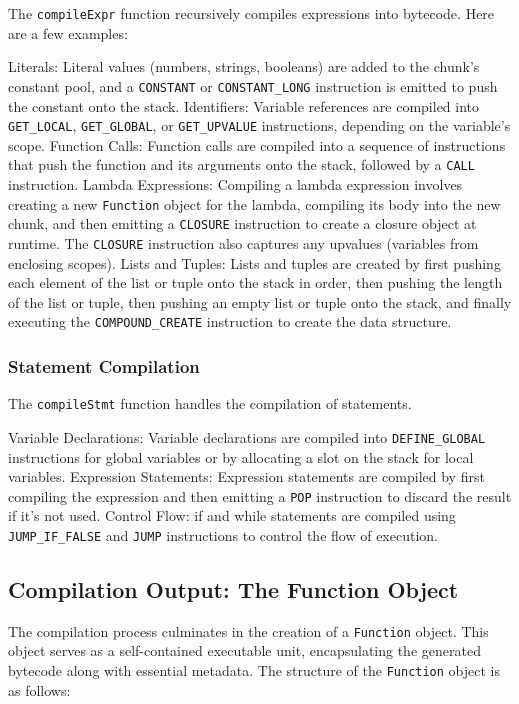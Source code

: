 The \texttt{compileExpr} function recursively compiles expressions into bytecode.
Here are a few examples:

Literals: Literal values (numbers, strings, booleans) are added to the chunk's constant pool, and a \texttt{CONSTANT} or \texttt{CONSTANT\_LONG} instruction is emitted to push the constant onto the stack.
Identifiers: Variable references are compiled into \texttt{GET\_LOCAL}, \texttt{GET\_GLOBAL}, or 
\texttt{GET\_UPVALUE} instructions, depending on the variable's scope.
Function Calls: Function calls are compiled into a sequence of instructions that push the function and its arguments onto the stack, followed by a \texttt{CALL} instruction.
Lambda Expressions: Compiling a lambda expression involves creating a new \texttt{Function} object for the lambda, compiling its body into the new chunk, and then emitting a \texttt{CLOSURE} instruction to create a closure object at runtime.
The \texttt{CLOSURE} instruction also captures any upvalues (variables from enclosing scopes).
Lists and Tuples: Lists and tuples are created by first pushing each element of the list or tuple onto the stack in 
order, then pushing the length of the list or tuple, then pushing an empty list or tuple onto the stack, and finally executing the \texttt{COMPOUND\_CREATE} instruction to create the data structure.

\subsubsection{Statement Compilation}

The \texttt{compileStmt} function handles the compilation of statements.

Variable Declarations: Variable declarations are compiled into \texttt{DEFINE\_GLOBAL} instructions for global 
variables or by allocating a slot on the stack for local variables.
Expression Statements: Expression statements are compiled by first compiling the expression and then emitting a \texttt{POP} instruction to discard the result if it's not used.
Control Flow: if and while statements are compiled using \texttt{JUMP\_IF\_FALSE} and \texttt{JUMP} instructions 
to control the flow of execution.

\subsection{Compilation Output: The Function Object}
\label{subsec:compilation-output}

The compilation process culminates in the creation of a \texttt{Function} object.
This object serves as a self-contained executable unit, encapsulating the generated bytecode along with essential metadata.
The structure of the \texttt{Function} object is as follows:

